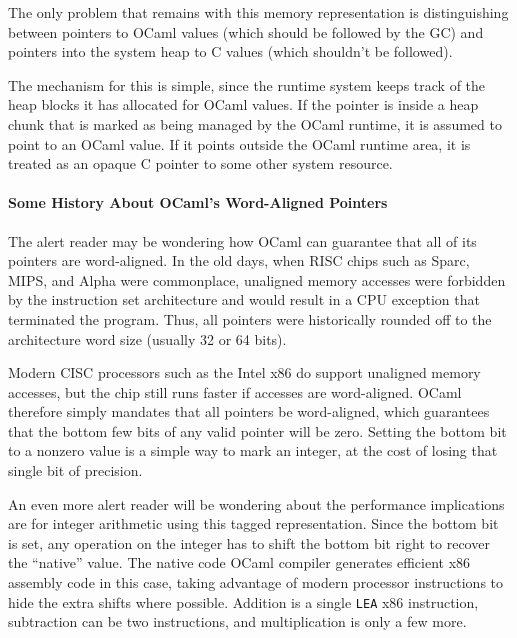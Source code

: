 The only problem that remains with this memory representation is
distinguishing between pointers to OCaml values (which should be
followed by the GC) and pointers into the system heap to C values (which
shouldn't be followed).

The mechanism for this is simple, since the runtime system keeps track
of the heap blocks it has allocated for OCaml values. If the pointer is
inside a heap chunk that is marked as being managed by the OCaml
runtime, it is assumed to point to an OCaml value. If it points outside
the OCaml runtime area, it is treated as an opaque C pointer to some
other system resource.

\hypertarget{some-history-about-ocamls-word-aligned-pointers}{%
\paragraph{Some History About OCaml's Word-Aligned
Pointers}\label{some-history-about-ocamls-word-aligned-pointers}}

The alert reader may be wondering how OCaml can guarantee that all of
its pointers are word-aligned. In the old days, when RISC chips such as
Sparc, MIPS, and Alpha were commonplace, unaligned memory accesses were
forbidden by the instruction set architecture and would result in a CPU
exception that terminated the program. Thus, all pointers were
historically rounded off to the architecture word size (usually 32 or 64
bits). 

Modern CISC processors such as the Intel x86 do support unaligned memory
accesses, but the chip still runs faster if accesses are word-aligned.
OCaml therefore simply mandates that all pointers be word-aligned, which
guarantees that the bottom few bits of any valid pointer will be zero.
Setting the bottom bit to a nonzero value is a simple way to mark an
integer, at the cost of losing that single bit of precision.

An even more alert reader will be wondering about the performance
implications are for integer arithmetic using this tagged
representation. Since the bottom bit is set, any operation on the
integer has to shift the bottom bit right to recover the ``native''
value. The native code OCaml compiler generates efficient x86 assembly
code in this case, taking advantage of modern processor instructions to
hide the extra shifts where possible. Addition is a single
\passthrough{\lstinline!LEA!} x86 instruction, subtraction can be two
instructions, and multiplication is only a few more.


